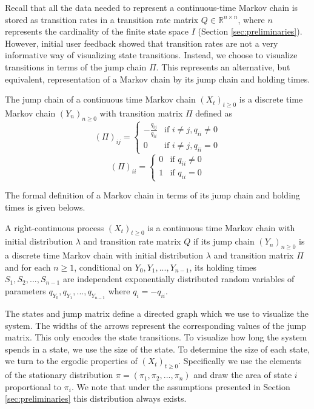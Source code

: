 Recall that all the data needed to represent a continuous-time Markov chain
is stored as transition rates in a transition rate matrix $Q \in \mathbb{R}^{n \times n}$, where $n$ represents
the cardinality of the finite state space $I$ (Section \ref{sec:preliminaries}). However, initial user
feedback showed that transition rates are not a very informative way of visualizing state transitions. Instead, 
we choose to visualize transitions in terms of the jump chain $\Pi$.
This represents an alternative, but equivalent, representation of a Markov chain by its jump chain and holding times. 

The jump chain of a continuous time Markov chain $(X_t)_{t \ge 0}$ is
a discrete time Markov chain $(Y_n)_{n \ge 0}$ with transition matrix $\Pi$ defined as
\begin{equation}
	\nonumber
	\left(\Pi\right)_{ij} = 
		\left\{
			\begin{array}{ll}
				-\frac{q_{ij}}{q_{ii}} & \mbox{if } i \ne j, q_{ii} \ne 0 \\
				0 & \mbox{if } i \ne j, q_{ii} = 0
			\end{array}
		\right.
\end{equation}
\begin{equation}
	\nonumber
	\left(\Pi\right)_{ii} = 
		\left\{
			\begin{array}{ll}
				0 & \mbox{if } q_{ii} \ne 0 \\
				1 & \mbox{if } q_{ii} = 0
			\end{array}
		\right.
\end{equation}

The formal definition of a Markov chain in terms of its jump chain and holding times is given belows.
\begin{defn}
	\label{def:jump-chain-holding-times}
	A right-continuous process $(X_t)_{t \ge 0}$ is a continuous time Markov chain with initial
	distribution $\lambda$ and transition rate matrix $Q$ if its jump chain $(Y_n)_{n \ge 0}$ is a 
	discrete time Markov chain with initial distribution $\lambda$ and transition matrix $\Pi$ and
	for each $n \ge 1$, conditional on $Y_0, Y_1, ..., Y_{n-1}$, its holding times $S_1, S_2, ..., S_{n-1}$
	are independent exponentially distributed random variables of parameters $q_{Y_0}, q_{Y_1}, ..., q_{Y_{n-1}}$
	where $q_i = -q_{ii}$.
\end{defn}

The states and jump matrix define a directed graph which we use to visualize the system. The widths of the arrows represent the corresponding values of the jump matrix. This only encodes the state transitions. To visualize how long the system spends in a state, we use the size of the state.
To determine the size of each state, we turn to the ergodic properties of $(X_t)_{t \ge 0}$. Specifically
we use the elements of the stationary distribution $\pi = (\pi_1, \pi_2, ..., \pi_n)$ and draw the area of
state $i$ proportional to $\pi_i$. We note that under the assumptions presented in Section \ref{sec:preliminaries}
this distribution always exists. 

